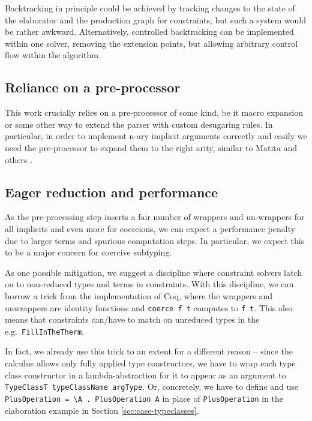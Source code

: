 Backtracking in principle could be achieved by tracking changes to the
state of the elaborator and the production graph for constraints, but
such a system would be rather awkward. Alternatively, controlled
backtracking can be implemented within one solver, removing the
extension points, but allowing arbitrary control flow within the
algorithm.

\hypertarget{reliance-on-a-pre-processor}{%
\subsection{Reliance on a
pre-processor}\label{reliance-on-a-pre-processor}}

This work crucially relies on a pre-processor of some kind, be it macro
expansion or some other way to extend the parser with custom desugaring
rules. In particular, in order to implement n-ary implicit arguments
correctly and easily we need the pre-processor to expand them to the
right arity, similar to Matita
\citep[chap.~5]{tassiBiDirectionalRefinementAlgorithm2012} and others
\citep{serranoQuickLookImpredicativity2020a, kovacsElaborationFirstclassImplicit2020}.

\hypertarget{eager-reduction-and-performance}{%
\subsection{Eager reduction and
performance}\label{eager-reduction-and-performance}}

As the pre-processing step inserts a fair number of wrappers and
un-wrappers for all implicits and even more for coercions, we can expect
a performance penalty due to larger terms and spurious computation
steps. In particular, we expect this to be a major concern for coercive
subtyping.

As one possible mitigation, we suggest a discipline where constraint
solvers latch on to non-reduced types and terms in constraints. With
this discipline, we can borrow a trick from the implementation of Coq,
where the wrappers and unwrappers are identity functions and
\texttt{coerce\ f\ t} computes to \texttt{f\ t}. This also means that
constraints can/have to match on unreduced types in the
e.g.~\texttt{FillInTheTherm}.

In fact, we already use this trick to an extent for a different reason
-- since the calculus allows only fully applied type constructors, we
have to wrap each type class constructor in a lambda-abstraction for it
to appear as an argument to \texttt{TypeClassT\ typeClassName\ argType}.
Or, concretely, we have to define and use
\texttt{PlusOperation\textquotesingle{}\ =\ \textbackslash{}A\ .\ PlusOperation\ A}
in place of \texttt{PlusOperation} in the elaboration example in Section
\ref{sec:case-typeclasses}.

